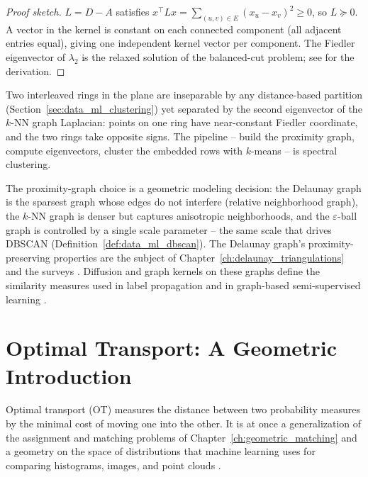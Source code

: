 \begin{proof}[Proof sketch]
  $L = D - A$ satisfies $x^{\top} L x = \sum_{(u,v) \in E} (x_u - x_v)^2 \geq
  0$, so $L \succeq 0$. A vector in the kernel is constant on each connected
  component (all adjacent entries equal), giving one independent kernel
  vector per component. The Fiedler eigenvector of $\lambda_2$ is the
  relaxed solution of the balanced-cut problem; see
  \cite{bishop2006,hastie2009} for the derivation.
\end{proof}

\begin{example}\label{ex:data_ml_spectral_clustering}
  Two interleaved rings in the plane are inseparable by any distance-based
  partition (Section~\ref{sec:data_ml_clustering}) yet separated by the
  second eigenvector of the $k$-NN graph Laplacian: points on one ring have
  near-constant Fiedler coordinate, and the two rings take opposite signs.
  The pipeline -- build the proximity graph, compute eigenvectors, cluster
  the embedded rows with $k$-means -- is spectral clustering.
\end{example}

\begin{remark}
  The proximity-graph choice is a geometric modeling decision: the Delaunay
  graph is the sparsest graph whose edges do not interfere (relative
  neighborhood graph), the $k$-NN graph is denser but captures anisotropic
  neighborhoods, and the $\varepsilon$-ball graph is controlled by a single
  scale parameter -- the same scale that drives DBSCAN
  (Definition~\ref{def:data_ml_dbscan}). The Delaunay graph's
  proximity-preserving properties are the subject of
  Chapter~\ref{ch:delaunay_triangulations} and the surveys
  \cite{okabe2000,aurenhammer1991}. Diffusion and graph kernels on these
  graphs define the similarity measures used in label propagation and in
  graph-based semi-supervised learning \cite{hastie2009}.
\end{remark}


\section{Optimal Transport: A Geometric Introduction}
\label{sec:data_ml_optimal_transport}

Optimal transport (OT) measures the distance between two probability
measures by the minimal cost of moving one into the other. It is at once a
generalization of the assignment and matching problems of
Chapter~\ref{ch:geometric_matching} and a geometry on the space of
distributions that machine learning uses for comparing histograms, images,
and point clouds \cite{peyre2019}.

